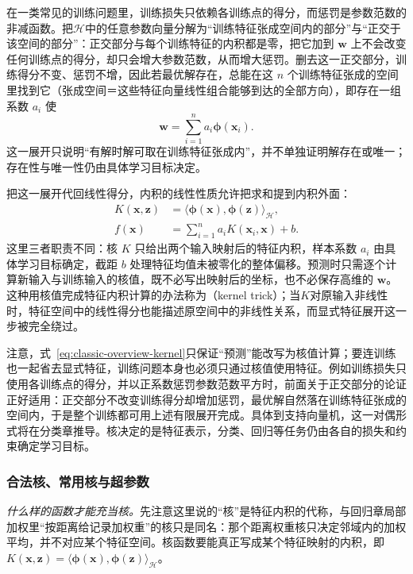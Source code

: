在一类常见的训练问题里，训练损失只依赖各训练点的得分，而惩罚是参数范数的非减函数。把$\mathcal H$中的任意参数向量分解为“训练特征张成空间内的部分”与“正交于该空间的部分”：正交部分与每个训练特征的内积都是零，把它加到 $\bm w$ 上不会改变任何训练点的得分，却只会增大参数范数，从而增大惩罚。删去这一正交部分，训练得分不变、惩罚不增，因此若最优解存在，总能在这 $n$ 个训练特征张成的空间里找到它（张成空间＝这些特征向量线性组合能够到达的全部方向），即存在一组系数 $a_i$ 使
\begin{equation}
  \bm w=\sum_{i=1}^n a_i\bm\phi(\bm x_i).
  \label{eq:classic-overview-weight-expansion}
\end{equation}
这一展开只说明“有解时解可取在训练特征张成内”，并不单独证明解存在或唯一；存在性与唯一性仍由具体学习目标决定。

把这一展开代回线性得分，内积的线性性质允许把求和提到内积外面：
\begin{equation}
  \begin{aligned}
    K(\bm x,\bm z)
      &=\langle\bm\phi(\bm x),\bm\phi(\bm z)\rangle_{\mathcal H},\\
    f(\bm x)&=\sum_{i=1}^n a_iK(\bm x_i,\bm x)+b.
  \end{aligned}
  \label{eq:classic-overview-kernel}
\end{equation}
这里三者职责不同：核 $K$ 只给出两个输入映射后的特征内积，样本系数 $a_i$ 由具体学习目标确定，截距 $b$ 处理特征均值未被零化的整体偏移。预测时只需逐个计算新输入与训练输入的核值，既不必写出映射后的坐标，也不必保存高维的 $\bm w$。这种用核值完成特征内积计算的办法称为（kernel trick）；当$K$对原输入非线性时，特征空间中的线性得分也能描述原空间中的非线性关系，而显式特征展开这一步被完全绕过。

注意，式~\eqref{eq:classic-overview-kernel}只保证“预测”能改写为核值计算；要连训练也一起省去显式特征，训练问题本身也必须只通过核值使用特征。例如训练损失只使用各训练点的得分，并以正系数惩罚参数范数平方时，前面关于正交部分的论证正好适用：正交部分不改变训练得分却增加惩罚，最优解自然落在训练特征张成的空间内，于是整个训练都可用上述有限展开完成。具体到支持向量机，这一对偶形式将在分类章推导。核决定的是特征表示，分类、回归等任务仍由各自的损失和约束确定学习目标。

\subsubsection{合法核、常用核与超参数}
\label{sec:classic-overview-kernel-validity}
\label{sec:classic-overview-common-kernels}

\emph{什么样的函数才能充当核。}先注意这里说的“核”是特征内积的代称，与回归章局部加权里“按距离给记录加权重”的核只是同名：那个距离权重核只决定邻域内的加权平均，并不对应某个特征空间。核函数要能真正写成某个特征映射的内积，即 $K(\bm x,\bm z)=\langle\bm\phi(\bm x),\bm\phi(\bm z)\rangle_{\mathcal H}$。


